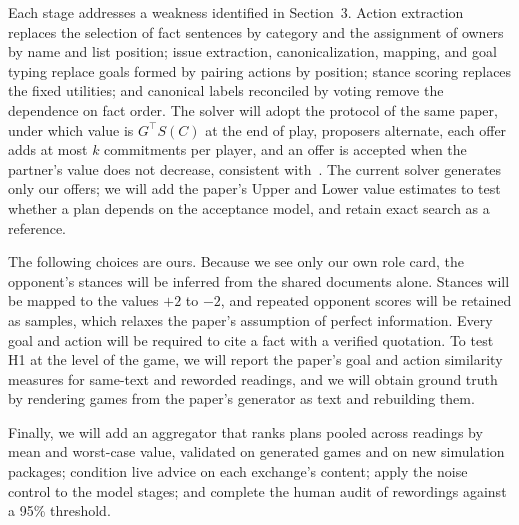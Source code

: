 \documentclass[10pt,twocolumn,letterpaper]{article}
\begin{document}
Each stage addresses a weakness identified in Section~3. Action extraction replaces the selection of fact sentences by category and the assignment of owners by name and list position; issue extraction, canonicalization, mapping, and goal typing replace goals formed by pairing actions by position; stance scoring replaces the fixed utilities; and canonical labels reconciled by voting remove the dependence on fact order. The solver will adopt the protocol of the same paper, under which value is $G^{\top}S(C)$ at the end of play, proposers alternate, each offer adds at most $k$ commitments per player, and an offer is accepted when the partner's value does not decrease, consistent with~\cite{zhu}. The current solver generates only our offers; we will add the paper's Upper and Lower value estimates to test whether a plan depends on the acceptance model, and retain exact search as a reference.

The following choices are ours. Because we see only our own role card, the opponent's stances will be inferred from the shared documents alone. Stances will be mapped to the values $+2$ to $-2$, and repeated opponent scores will be retained as samples, which relaxes the paper's assumption of perfect information. Every goal and action will be required to cite a fact with a verified quotation. To test H1 at the level of the game, we will report the paper's goal and action similarity measures for same-text and reworded readings, and we will obtain ground truth by rendering games from the paper's generator as text and rebuilding them.

Finally, we will add an aggregator that ranks plans pooled across readings by mean and worst-case value, validated on generated games and on new simulation packages; condition live advice on each exchange's content; apply the noise control to the model stages; and complete the human audit of rewordings against a 95\% threshold.
\end{document}
